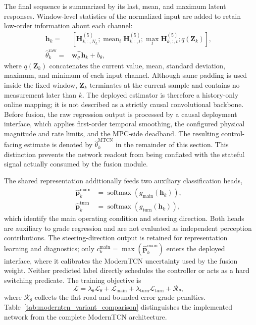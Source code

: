 \documentclass{ieeeaccess}
\begin{document}
The final sequence is summarized by its last, mean, and maximum latent responses. Window-level statistics of the normalized input are added to retain low-order information about each channel:
\begin{equation}
\begin{aligned}
\mathbf h_k={}&\left[
\mathbf H_{k,:,N_h}^{(5)};
\operatorname{mean}_{t}\mathbf H_{k,:,t}^{(5)};
\operatorname{max}_{t}\mathbf H_{k,:,t}^{(5)};
q(\mathbf Z_k)\right],\\
\hat{\theta}^{\mathrm{raw}}_k
 ={}&\mathbf w_{\theta}^{\mathsf T}\mathbf h_k+b_{\theta},
\end{aligned}
\label{eq:moderntcn_readout}
\end{equation}
where $q(\mathbf Z_k)$ concatenates the current value, mean, standard deviation, maximum, and minimum of each input channel. Although same padding is used inside the fixed window, $\mathbf Z_k$ terminates at the current sample and contains no measurement later than $k$. The deployed estimator is therefore a history-only online mapping; it is not described as a strictly causal convolutional backbone. Before fusion, the raw regression output is processed by a causal deployment interface, which applies first-order temporal smoothing, the configured physical magnitude and rate limits, and the MPC-side deadband. The resulting control-facing estimate is denoted by $\hat{\theta}^{\mathrm{MTCN}}_k$ in the remainder of this section. This distinction prevents the network readout from being conflated with the stateful signal actually consumed by the fusion module.

The shared representation additionally feeds two auxiliary classification heads,
\begin{equation}
\begin{aligned}
\hat{\mathbf p}^{\mathrm{main}}_k
&=\operatorname{softmax}\!\left(g_{\mathrm{main}}(\mathbf h_k)\right),\\
\hat{\mathbf p}^{\mathrm{turn}}_k
&=\operatorname{softmax}\!\left(g_{\mathrm{turn}}(\mathbf h_k)\right),
\end{aligned}
\label{eq:slope_auxiliary_outputs}
\end{equation}
which identify the main operating condition and steering direction. Both heads are auxiliary to grade regression and are not evaluated as independent perception contributions. The steering-direction output is retained for representation learning and diagnostics; only $c_k^{\mathrm{main}}=\max(\hat{\mathbf p}^{\mathrm{main}}_k)$ enters the deployed interface, where it calibrates the ModernTCN uncertainty used by the fusion weight. Neither predicted label directly schedules the controller or acts as a hard switching predicate. The training objective is
\begin{equation}
\mathcal L=
\lambda_{\theta}\mathcal L_{\theta}
+\mathcal L_{\mathrm{main}}
+\lambda_{\mathrm{turn}}\mathcal L_{\mathrm{turn}}
+\mathcal R_{\theta},
\label{eq:slope_estimator_loss}
\end{equation}
where $\mathcal R_{\theta}$ collects the flat-road and bounded-error grade penalties. Table~\ref{tab:moderntcn_variant_comparison} distinguishes the implemented network from the complete ModernTCN architecture.
\end{document}
